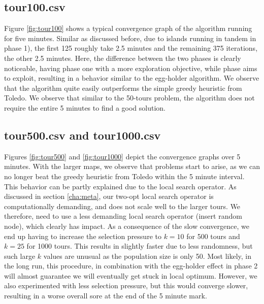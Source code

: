 \documentclass[a4paper,10pt]{article}
\newcommand{\ReplaceMe}[1]{{\color{blue}#1}}
\begin{document}
	




\subsection{tour100.csv}\label{sec_shorttour}
Figure \ref{fig:tour100} shows a typical convergence graph of the algorithm running for five minutes. Similar as discussed before, due to islands running in tandem in phase 1), the first 125 roughly take 2.5 minutes and the remaining 375 iterations, the other 2.5 minutes. Here, the difference between the two phases is clearly noticeable, having phase one with a more exploration objective, while phase aims to exploit, resulting in a behavior similar to the egg-holder algorithm. We observe that the algorithm quite easily outperforms the simple greedy heuristic from Toledo. We observe that similar to the 50-tours problem, the algorithm does not require the entire 5 minutes to find a good solution.

%
%

\subsection{tour500.csv and tour1000.csv}
Figures \ref{fig:tour500} and \ref{fig:tour1000} depict the convergence graphs over 5 minutes. With the larger maps, we observe that problems start to arise, as we can no longer beat the greedy heuristic from Toledo within the 5 minute interval. This behavior can be partly explained due to the local search operator. As discussed in section \ref{cha:meta}, our two-opt local search operator is computationally demanding, and does not scale well to the larger tours. We therefore, need to use a less demanding local search operator (insert random node), which clearly has impact. As a consequence of the slow convergence, we end up having to increase the selection pressure to $k=10$  for 500 tours and $k=25$ for 1000 tours. This results in slightly faster due to less randomness, but such large $k$ values are unusual as the population size is only 50. Most likely, in the long run, this procedure, in combination with the egg-holder effect in phase 2 will almost guarantee we will eventually get stuck in local optimum. However, we also experimented with less selection pressure, but this would converge slower, resulting in a worse overall sore at the end of the 5 minute mark.
\end{document}
